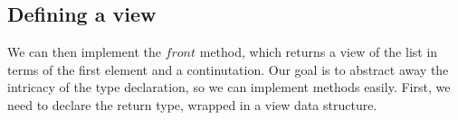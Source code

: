 \documentclass[12pt,twoside,notitlepage]{report}
\begin{document}
\subsection{Defining a view} 

We can then implement the $front$ method, which returns a view of the list in terms of the first element and a continutation. Our goal is to abstract away the intricacy of the type declaration, so we can implement methods  easily. First, we need to declare the return type, wrapped in a view data structure.


\begin{code}
\\
\>[0]\<[4]%
\>[4]  \AgdaSymbol{(} \AgdaSymbol{:} \AgdaSymbol{)} \AgdaSymbol{:}  \<%
\\
\>[4]\<[6]%
\>[6] \AgdaSymbol{:}  \<%
\\
\>[4]\<[6]%
\>[6] \AgdaSymbol{:}       \<%
\\
%
\\
\>[0]\<[4]%
\>[4] \AgdaSymbol{:} \AgdaSymbol{\{} \AgdaSymbol{:} \AgdaSymbol{\}}      \<%
\\
\>[0]\<[4]%
\>[4]  \AgdaSymbol{=} \<%
\\
\>[0]\<[4]%
\>[4] \AgdaSymbol{(} \AgdaSymbol{(} \AgdaSymbol{)} \AgdaSymbol{)} \AgdaSymbol{=}  \AgdaSymbol{(} \AgdaInductiveConstructor{,}  \AgdaSymbol{)}\<%
\\
\>[0]\<[4]%
\>[4] \AgdaSymbol{(} \AgdaSymbol{(} \AgdaSymbol{(} \AgdaSymbol{)} \AgdaSymbol{)} \AgdaSymbol{)} \AgdaSymbol{=}  \AgdaSymbol{(} \AgdaInductiveConstructor{,}   \AgdaSymbol{)}\<%
\\
\end{code}
\end{document}
